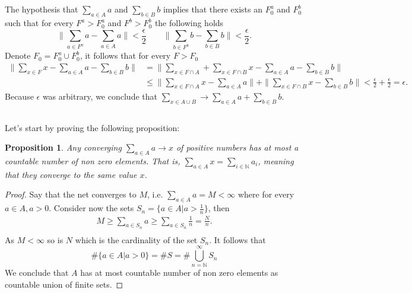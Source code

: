 \documentclass[a4paper,12pt]{article} %
\newtheorem{proposition}{Proposition}
\begin{document}
\subsection{}
The hypothesis that \(\sum_{a \in  A}a  \) and \(\sum_{b \in  B}b  \) implies that there exists an \(F_0^a\) and \(F_0^b\) such that for every \(F^a>F_0^a\) and \(F^b>F_0^b\) the following holds
\begin{equation}
    \| \sum_{a \in  F^a}a - \sum_{a \in  A}a   \| < \frac{\epsilon}{2} \quad \quad \| \sum_{b \in  F^b}b - \sum_{b \in  B}b   \|< \frac{\epsilon}{2}.
\end{equation}
Denote \(F_0 = F_0^a \cup F_0^b\), it follows that for every \(F > F_0\)
\begin{align*}
    \| \sum_{x \in  F}x - \sum_{a\in A}a - \sum_{b \in  B }b    \| & = \| \sum_{x \in  F \cap A} + \sum_{x \in F \cap B}x - \sum_{a \in  A}a - \sum_{b \in  B}b     \|                                                             \\
                                                                   & \leq \| \sum_{x \in  F \cap A}x - \sum_{a \in  A}a   \|+\| \sum_{x \in F \cap B}x - \sum_{b \in  B }b \|< \frac{\epsilon}{2} + \frac{\epsilon}{2} = \epsilon.
\end{align*}
Because \(\epsilon\) was arbitrary, we conclude that \(\sum_{x \in A \cup B}\to \sum_{a \in  A} a + \sum_{b \in  B}b   \).

\subsection{}
Let's start by proving the following proposition:

\begin{proposition}
    Any converging \(\sum_{a \in  A}a \to x\)  of positive numbers has at most a countable number of non zero elements. That is, \(\sum_{a \in A}x = \sum_{i \in  \mathbb{N}}a_i \), meaning that they converge to the same value \(x\).
\end{proposition}
\begin{proof}
    Say that the net converges to \(M\), i.e. \(\sum_{a \in  A} a = M <\infty  \) where for every \(a \in A, a>0\). Consider now the sets \(S_n = \{ a \in  A | a> \frac{1}{n} \} \), then
    \begin{align*}
        M \geq \sum_{a \in  S_n}a \geq  \sum_{a \in  S_n}\frac{1}{n}= \frac{N}{n}. \\
    \end{align*}
    As \(M < \infty \)  so is \(N\) which is the cardinality of the set \(S_n\).
    It follows that
    \begin{equation}
        \# \{ a \in  A | a>0 \}= \# S = \# \bigcup_{n=\mathbb{N}}^{\infty} S_n
    \end{equation}
    We conclude that \(A\) has at most countable number of non zero elements as countable union of finite sets.
\end{proof}
\end{document}

